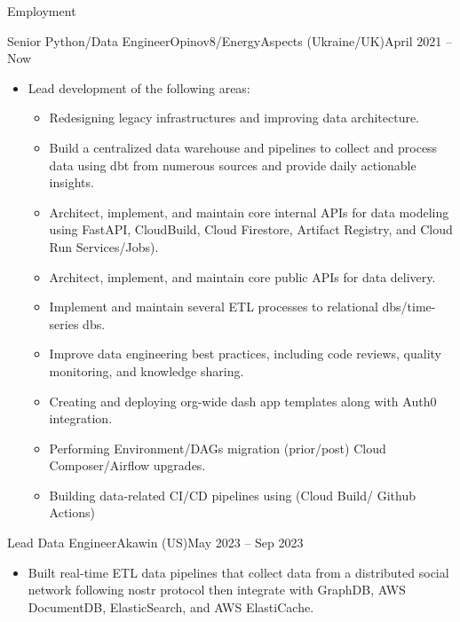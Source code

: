 \documentclass[]{ahmedamrcv_saudi}
\begin{document}
	\makeheader
	
	\begin{cvsection}{Employment}
		\begin{cvsubsection}{Senior Python/Data Engineer}{Opinov8/EnergyAspects (Ukraine/UK)}{April 2021 -- Now}
			\begin{itemize}
				\item Lead development of the following areas:
				\begin{itemize}
					\item Redesigning legacy infrastructures and improving data architecture.
					\item Build a centralized data warehouse and pipelines to collect and process data using dbt from numerous sources and provide daily actionable insights.
					\item Architect, implement, and maintain core internal APIs for data modeling using FastAPI, CloudBuild, Cloud Firestore, Artifact Registry, and Cloud Run Services/Jobs).
					\item Architect, implement, and maintain core public APIs for data delivery.
					\item Implement and maintain several ETL processes to relational dbs/time-series dbs.
					\item Improve data engineering best practices, including code reviews, quality monitoring, and knowledge sharing.
					\item Creating and deploying org-wide dash app templates along with Auth0 integration.
					\item Performing Environment/DAGs migration (prior/post) Cloud Composer/Airflow upgrades.
					\item Building data-related CI/CD pipelines using (Cloud Build/ Github Actions)
				\end{itemize}
			\end{itemize}
		\end{cvsubsection}

		\begin{cvsubsection}{Lead Data Engineer}{Akawin (US)}{May 2023 -- Sep 2023}
			\begin{itemize}
				\item Built real-time ETL data pipelines that collect data from a distributed social network following nostr protocol then integrate with GraphDB, AWS DocumentDB, ElasticSearch, and AWS ElastiCache.
			\end{itemize}
		\end{cvsubsection}


\end{cvsection}
\end{document}
